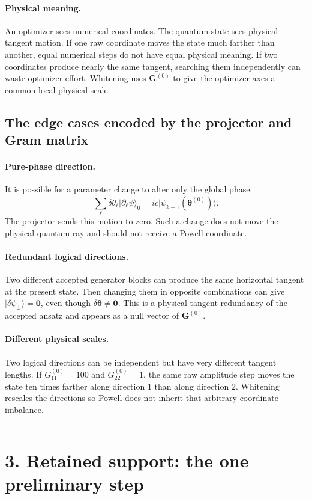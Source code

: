 \documentclass[11pt]{article}
\newcommand{\ket}[1]{\lvert #1\rangle}
\newcommand{\conceptbreak}{%
  \par\medskip\noindent
  {\color{black!30}\rule{\textwidth}{0.35pt}}%
  \par\medskip}
\newcommand{\physical}{\paragraph{Physical meaning.}}
\begin{document}
\physical An optimizer sees numerical coordinates.  The quantum state sees
physical tangent motion.  If one raw coordinate moves the state much farther
than another, equal numerical steps do not have equal physical meaning.  If
two coordinates produce nearly the same tangent, searching them independently
can waste optimizer effort.  Whitening uses \(\mathbf G^{(0)}\) to give the
optimizer axes a common local physical scale.

\subsection*{The edge cases encoded by the projector and Gram matrix}

\paragraph{Pure-phase direction.}
It is possible for a parameter change to alter only the global phase:
\[
\sum_\ell\delta\theta_\ell\ket{\partial_\ell\psi}_{0}
=
i c\ket{\psi_{k+1}(\boldsymbol\theta^{(0)})}.
\]
The projector sends this motion to zero.  Such a change does not move the
physical quantum ray and should not receive a Powell coordinate.

\paragraph{Redundant logical directions.}
Two different accepted generator blocks can produce the same horizontal
tangent at the present state.  Then changing them in opposite combinations
can give
\(\ket{\delta\psi_\perp}=\mathbf 0\), even though
\(\delta\boldsymbol\theta\ne\mathbf0\).  This is a physical tangent
redundancy of the accepted ansatz and appears as a null vector of
\(\mathbf G^{(0)}\).

\paragraph{Different physical scales.}
Two logical directions can be independent but have very different tangent
lengths.  If
\(G_{11}^{(0)}=100\) and \(G_{22}^{(0)}=1\), the same raw amplitude step moves
the state ten times farther along direction \(1\) than along direction \(2\).
Whitening rescales the directions so Powell does not inherit that arbitrary
coordinate imbalance.

\conceptbreak

\section*{3. Retained support: the one preliminary step}
\end{document}
